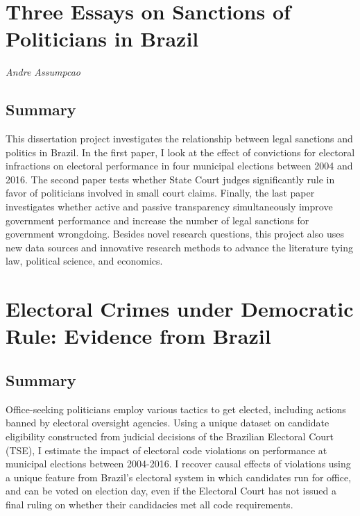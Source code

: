 \documentclass[]{article}
\title{}
\author{}
\date{}
\begin{document}
\hypertarget{three-essays-on-sanctions-of-politicians-in-brazil}{%
\section*{Three Essays on Sanctions of Politicians in
Brazil}\label{three-essays-on-sanctions-of-politicians-in-brazil}}

\emph{Andre Assumpcao}

\hypertarget{summary}{%
\subsection*{Summary}\label{summary}}

This dissertation project investigates the relationship between legal
sanctions and politics in Brazil. In the first paper, I look at the
effect of convictions for electoral infractions on electoral performance
in four municipal elections between 2004 and 2016. The second paper
tests whether State Court judges significantly rule in favor of
politicians involved in small court claims. Finally, the last paper
investigates whether active and passive transparency simultaneously
improve government performance and increase the number of legal
sanctions for government wrongdoing. Besides novel research questions,
this project also uses new data sources and innovative research methods
to advance the literature tying law, political science, and economics.

\hypertarget{title1}{%
\section{Electoral Crimes under Democratic Rule: Evidence from
Brazil}\label{title1}}

\hypertarget{summary-1}{%
\subsection{Summary}\label{summary-1}}

Office-seeking politicians employ various tactics to get elected,
including actions banned by electoral oversight agencies. Using a unique
dataset on candidate eligibility constructed from judicial decisions of
the Brazilian Electoral Court (TSE), I estimate the impact of electoral
code violations on performance at municipal elections between 2004-2016.
I recover causal effects of violations using a unique feature from
Brazil's electoral system in which candidates run for office, and can be
voted on election day, even if the Electoral Court has not issued a
final ruling on whether their candidacies met all code requirements.
\end{document}
